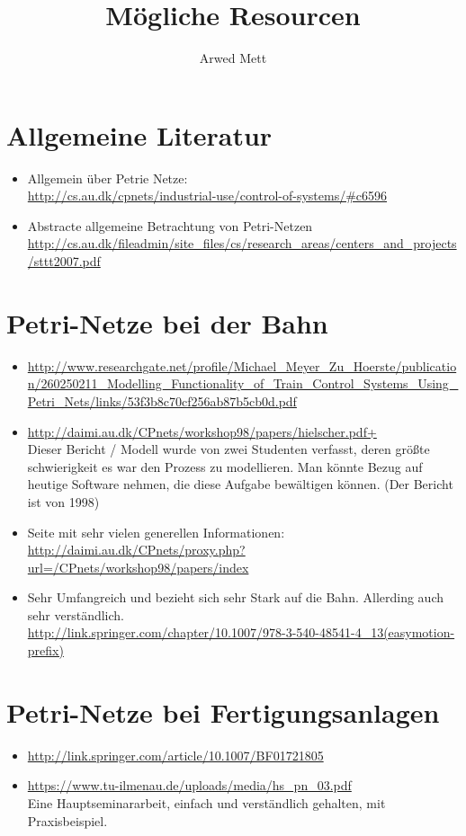 \documentclass{article}
\author{Arwed Mett}
\title{Mögliche Resourcen}
\begin{document}
\maketitle

\section{Allgemeine Literatur}
\begin{itemize}
    \item Allgemein über Petrie Netze:\\
        \url{http://cs.au.dk/cpnets/industrial-use/control-of-systems/#c6596}
    \item Abstracte allgemeine Betrachtung von Petri-Netzen\\
        \url{http://cs.au.dk/fileadmin/site_files/cs/research_areas/centers_and_projects/sttt2007.pdf}
\end{itemize}

\section{Petri-Netze bei der Bahn}
\begin{itemize}
    \item \url{http://www.researchgate.net/profile/Michael_Meyer_Zu_Hoerste/publication/260250211_Modelling_Functionality_of_Train_Control_Systems_Using_Petri_Nets/links/53f3b8c70cf256ab87b5cb0d.pdf}
    \item \url{http://daimi.au.dk/CPnets/workshop98/papers/hielscher.pdf+}\\
        Dieser Bericht / Modell wurde von zwei Studenten verfasst, deren größte schwierigkeit es war den Prozess zu modellieren.
        Man könnte Bezug auf heutige Software nehmen, die diese Aufgabe bewältigen können. (Der Bericht ist von 1998)

    \item Seite mit sehr vielen generellen Informationen:\\
        \url{http://daimi.au.dk/CPnets/proxy.php?url=/CPnets/workshop98/papers/index}
    \item Sehr Umfangreich und bezieht sich sehr Stark auf die Bahn. Allerding auch sehr verständlich.\\
        \url{http://link.springer.com/chapter/10.1007/978-3-540-48541-4_13(easymotion-prefix)}
\end{itemize}

\section{Petri-Netze bei Fertigungsanlagen}
\begin{itemize}
    \item \url{http://link.springer.com/article/10.1007/BF01721805} \\
    \item \url{https://www.tu-ilmenau.de/uploads/media/hs_pn_03.pdf} \\
        Eine Hauptseminararbeit, einfach und verständlich gehalten, mit Praxisbeispiel.
\end{itemize}
\end{document}

